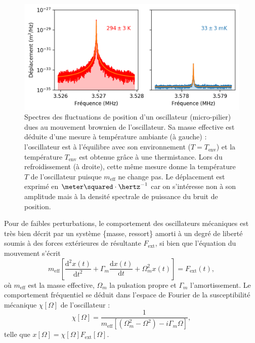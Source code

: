 \documentclass[12pt,a4paper]{article}
\renewcommand{\d}{\mathrm{d}}
\begin{document}
\begin{figure}[b!]
\center
\includegraphics[scale=0.75]{figures/thermal_peak_def_filled.png}
\caption{Spectres des fluctuations de position d'un oscillateur (micro-pilier) dues au mouvement brownien de l'oscillateur.
Sa masse effective est déduite d'une mesure à température ambiante (à gauche) : l'oscillateur est à l'équilibre avec son environnement ($T=T_\mathrm{env}$) et la température $T_\mathrm{env}$ est obtenue grâce à une thermistance.
Lors du refroidissement (à droite), cette même mesure donne la température $T$ de l'oscillateur puisque $m_\mathrm{eff}$ ne change pas. 
Le déplacement est exprimé en $\meter\squared\cdot\hertz^{-1}$ car on s'intéresse non à son amplitude mais à la densité spectrale de puissance du bruit de position.}
\label{fig:thermal_noise}
\end{figure}

Pour de faibles perturbations, le comportement des oscillateurs mécaniques est très bien décrit par un système \{masse, ressort\} amorti à un degré de liberté soumis à des forces extérieures de résultante $F_\mathrm{ext}$, si bien que l'équation du mouvement s'écrit
\begin{equation}
m_\mathrm{eff}\left[\frac{\d ^2 x(t)}{\d t^2} + \Gamma_m \frac{\d  x(t)}{\d t} +  \Omega_m^2 x(t)\right] = F_\mathrm{ext}(t),
\label{eq:eq_of_motion}
\end{equation}
où $m_\mathrm{eff}$ est la masse effective, $\Omega_m$ la pulsation propre et $\Gamma_m$ l'amortissement.
Le comportement fréquentiel se déduit dans l'espace de Fourier de la susceptibilité mécanique $\chi[\Omega]$ de l'oscillateur :
\begin{equation}
\chi[\Omega] = \frac{1}{m_\mathrm{eff}[(\Omega_m^2-\Omega^2)-i\Gamma_m\Omega]},
\end{equation}
telle que $x[\Omega] = \chi[\Omega]F_\mathrm{ext}[\Omega]$.
\end{document}
